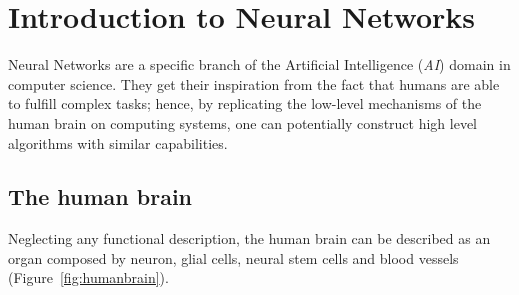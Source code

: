 \section{Introduction to Neural Networks}
Neural Networks are a specific branch of the Artificial Intelligence (\emph{AI}) domain in computer science.
They get their inspiration from the fact that humans are able to fulfill complex tasks; hence, by replicating the low-level mechanisms of the human brain on computing systems, one can potentially construct high level algorithms with similar capabilities.

\subsection{The human brain}
Neglecting any functional description, the human brain can be described as an organ composed by neuron, glial cells, neural stem cells and blood vessels (Figure~\ref{fig:humanbrain}).
